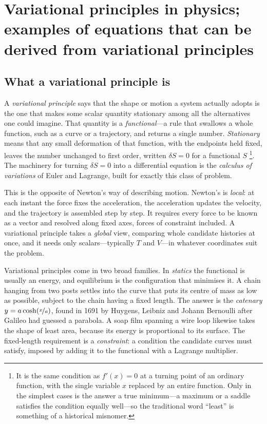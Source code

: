 \section{Variational principles in physics; examples of equations that can be derived from variational principles}
\label{sec:variational}

    \subsection{What a variational principle is}\label{sec:variational-intro}

        A \emph{variational principle} says that the shape or motion a system actually adopts is the one that makes some scalar quantity stationary among all the alternatives one could imagine. That quantity is a \emph{functional}---a rule that swallows a whole function, such as a curve or a trajectory, and returns a single number. \emph{Stationary} means that any small deformation of that function, with the endpoints held fixed, leaves the number unchanged to first order, written $\delta S = 0$ for a functional $S$ \footnote{
            It is the same condition as $f'(x) = 0$ at a turning point of an ordinary function, with the single variable $x$ replaced by an entire function. Only in the simplest cases is the answer a true minimum---a maximum or a saddle satisfies the condition equally well---so the traditional word \enquote{least} is something of a historical misnomer.}.
        The machinery for turning $\delta S = 0$ into a differential equation is the \emph{calculus of variations} of Euler and Lagrange, built for exactly this class of problem.

        This is the opposite of Newton's way of describing motion. Newton's is \emph{local}: at each instant the force fixes the acceleration, the acceleration updates the velocity, and the trajectory is assembled step by step. It requires every force to be known as a vector and resolved along fixed axes, forces of constraint included. A variational principle takes a \emph{global} view, comparing whole candidate histories at once, and it needs only scalars---typically $T$ and $V$---in whatever coordinates suit the problem.

        Variational principles come in two broad families. In \emph{statics} the functional is usually an energy, and equilibrium is the configuration that minimises it. A chain hanging from two posts settles into the curve that puts its centre of mass as low as possible, subject to the chain having a fixed length. The answer is the \emph{catenary} $y = a\cosh\!\left(\nicefrac{x}{a}\right)$, found in 1691 by Huygens, Leibniz and Johann Bernoulli after Galileo had guessed a parabola. A soap film spanning a wire loop likewise takes the shape of least area, because its energy is proportional to its surface. The fixed-length requirement is a \emph{constraint}: a condition the candidate curves must satisfy, imposed by adding it to the functional with a Lagrange multiplier.

